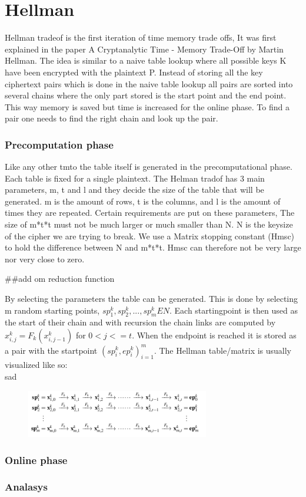 \chapter{Hellman}
Hellman tradeof is the first iteration of time memory trade offs, It was first explained in the paper A Cryptanalytic Time - Memory Trade-Off by Martin Hellman.
The idea is similar to a naive table lookup where all possible keys K have been encrypted with the plaintext P. Instead of storing all the key ciphertext pairs which is done in the naive table lookup all pairs are sorted into several chains where the only part stored is the start point and the end point. This way memory is saved but time is increased for the online phase. To find a pair one needs to find the right chain and look up the pair.


\subsection*{Precomputation phase}
Like any other tmto the table itself is generated in the precomputational phase. Each table is fixed for a single plaintext.
The Helman tradof has 3 main parameters, m, t and l and they decide the size of the table that will be generated.
m is the amount of rows, t is the columns, and l is the amount of times they are repeated.
Certain requirements are put on these parameters, The size of m*t*t must not be much larger or much smaller than N.
N is the keysize of the cipher we are trying to break. We use a Matrix stopping constant (Hmsc) to hold the difference between N and m*t*t. Hmsc can therefore not be very large nor very close to zero.

##add om reduction function

By selecting the parameters the table can be generated. This is done by selecting m random starting points, $ sp^{k}_1,sp^{k}_2,...,sp^{k}_m E N$. Each startingpoint is then used as the start of their chain and with recursion the chain links are computed by $ x^{k}_{i,j}=F_k( x^{k}_{i,j-1})$ for $0<j<=t$. When the endpoint is reached it is stored as a pair with the startpoint ${( sp^{k}_{i}, ep^{k}_{i})}^{m}_{i=1}$.
The Hellman table/matrix is usually visualized like so:
\\sad
\begin{figure}[t]
  \includegraphics[width=8cm]{figures/HellmanMatrix.png}
\centering
\end{figure}
\subsection*{Online phase}
\subsection*{Analasys}
